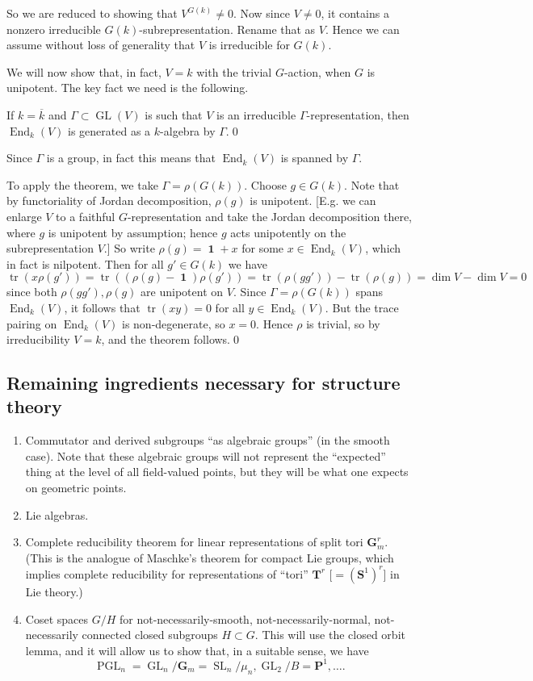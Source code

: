 \documentclass[10pt]{article}
\newcommand{\PP}{\mathbf{P}}
\renewcommand{\SS}{\mathbf{S}}
\newcommand{\TT}{\mathbf{T}}
\newcommand{\GL}{\operatorname{GL}}
\newcommand{\PGL}{\operatorname{PGL}}
\newcommand{\SL}{\operatorname{SL}}
\newcommand{\tr}{\operatorname{tr}}
\renewcommand{\(}{\left(}
\renewcommand{\)}{\right)}
\renewcommand{\bar}{\overline}
\newcommand{\End}{\operatorname{End}}
\DeclareMathOperator{\id}{\mathbf{1}}
\numberwithin{thm}{subsection}
\begin{document}
So we are reduced to showing that $V^{G(k)}\neq 0$.
Now since $V\neq 0$, it contains a nonzero irreducible $G(k)$-subrepresentation.
Rename that as $V$. Hence we can assume without loss of generality that $V$ is
irreducible for $G(k)$. 

We will now show that, in fact, $V=k$ with the trivial $G$-action, when $G$ is unipotent.
The key fact we need is the following.
\begin{thm}[Wedderburn]
If $k=\bar k$ and $\Gamma\subset \GL(V)$
is such that $V$ is an irreducible $\Gamma$-representation,
then $\End_k(V)$ is generated as a $k$-algebra by $\Gamma$.\qed
\end{thm}
Since $\Gamma$ is a group, in fact this means that $\End_k(V)$ is spanned by $\Gamma$.

To apply the theorem, we take $\Gamma=\rho(G(k))$.
Choose $g\in G(k)$.
Note that by functoriality of Jordan decomposition, $\rho(g)$ is unipotent.
[E.g. we can enlarge $V$ to a faithful $G$-representation and take the Jordan decomposition there, where $g$ is unipotent by assumption;
hence $g$ acts unipotently on the subrepresentation $V$.]
So write $\rho(g)=\id+x$ for some $x\in \End_k(V)$, which in fact is nilpotent.
Then for all $g'\in G(k)$ we have
\[\tr(x\rho(g'))=\tr((\rho(g)-\id)\rho(g'))
=\tr(\rho(gg'))-\tr(\rho(g))=\dim V- \dim V =0\]
since both $\rho(gg'),\rho(g)$ are unipotent on $V$.
Since $\Gamma=\rho(G(k))$ spans $\End_k(V)$,
it follows that $\tr(xy)=0$ for all $y\in \End_k(V)$.
But the trace pairing on $\End_k(V)$ is non-degenerate,
so $x=0$. Hence $\rho$ is trivial,
so by irreducibility $V=k$,
and the theorem follows.\qed
\subsection{Remaining ingredients necessary for structure theory}
\begin{enumerate}
\item Commutator and derived subgroups ``as algebraic groups'' (in the smooth case). Note that these algebraic groups will not represent
the ``expected'' thing at the level of all field-valued points,
but they will be what one expects on geometric points.
\item Lie algebras.
\item Complete reducibility theorem for linear representations
of split tori $\mathbf{G}_m^r$. (This is the analogue
of Maschke's theorem for compact Lie groups,
which implies complete reducibility for representations of ``tori'' $\TT^r$ [$=(\SS^1)^r$] in Lie theory.)
\item Coset spaces $G/H$ for not-necessarily-smooth, not-necessarily-normal,
not-necessarily connected
closed subgroups $H\subset G$.
This will use the closed orbit lemma, 
and it will allow us to show that, in a suitable sense, we have
\[\PGL_n=\GL_n/\mathbf{G}_m=\SL_n/\mu_n, \GL_2/B=\PP^1,\ldots.\]
\end{enumerate} 
\end{document}
